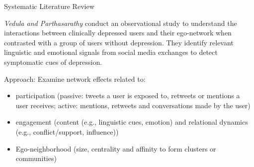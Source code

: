 \documentclass[aspectratio=169,10pt,xcolor={dvipsnames}]{beamer}
\begin{document}
\begin{frame}{Systematic Literature Review}
  \begin{block}{}
    \textit{Vedula and Parthasarathy} conduct an observational study to understand the interactions between clinically depressed users and their ego-network when contrasted with a group of users without depression. They identify relevant linguistic and emotional signals from social media exchanges to detect symptomatic cues of depression\cite{Vedula2017}.
  \end{block}

  \begin{block}{\small{Approach:}}
    Examine network effects related to:
    \begin{itemize}
      \item participation (passive: tweets a user is exposed to, retweets or mentions a user receives; active: mentions, retweets and conversations made by the user)
      \item engagement (content (e.g., linguistic cues, emotion) and relational dynamics (e.g., conflict/support, influence))
      \item Ego-neighborhood (size, centrality and affinity to form clusters or communities)
    \end{itemize}
  \end{block}
\end{frame}
\end{document}
